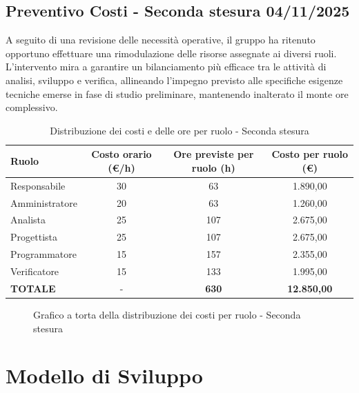 \documentclass[a4paper, 11pt, oneside]{scrartcl} %
\begin{document}
\subsection{Preventivo Costi - Seconda stesura 04/11/2025}
\label{sec:preventivo_v2}
A seguito di una revisione delle necessità operative, il gruppo ha ritenuto opportuno effettuare una rimodulazione delle risorse assegnate ai diversi ruoli.
L'intervento mira a garantire un bilanciamento più efficace tra le attività di analisi, sviluppo e verifica, allineando l'impegno previsto alle specifiche esigenze tecniche emerse in fase di studio preliminare, mantenendo inalterato il monte ore complessivo.
\begin{table}[!ht]
\centering
\renewcommand{\arraystretch}{1.4}
\begin{tabularx}{\textwidth}{L c c c}
\toprule
\textbf{Ruolo} & \textbf{Costo orario (€/h)} & \textbf{Ore previste per ruolo (h)} & \textbf{Costo per ruolo (€)} \\
\midrule
Responsabile & 30 & 63 & 1.890,00 \\
Amministratore & 20 & 63 & 1.260,00 \\
Analista & 25 & 107 & 2.675,00 \\
Progettista & 25 & 107 & 2.675,00 \\
Programmatore & 15 & 157 & 2.355,00 \\
Verificatore & 15 & 133 & 1.995,00 \\
\midrule
\textbf{TOTALE} & - & \textbf{630} & \textbf{12.850,00} \\
\bottomrule
\end{tabularx}
\caption{Distribuzione dei costi e delle ore per ruolo - Seconda stesura}
\end{table}

\begin{figure}[!ht]
\centering
{}
\caption{Grafico a torta della distribuzione dei costi per ruolo - Seconda stesura}
\end{figure}

\newpage
\section{Modello di Sviluppo}
\end{document}
